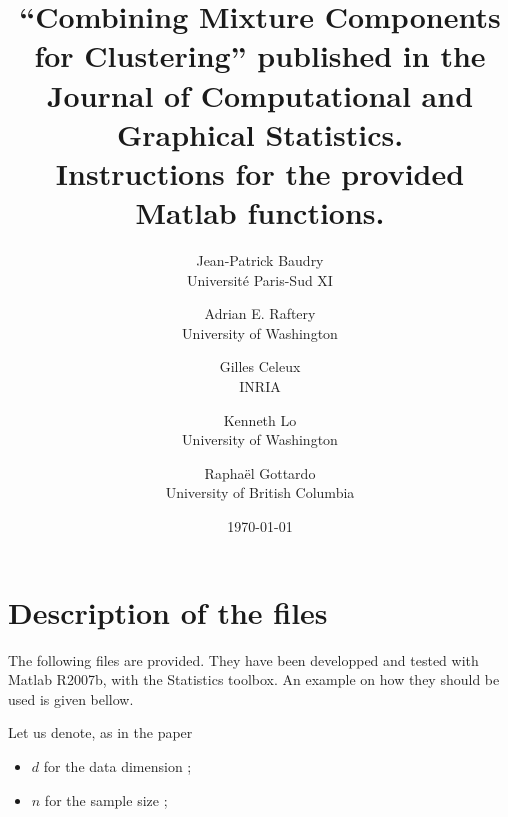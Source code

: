 \documentclass[12pt]{article}
\title{``Combining Mixture Components for Clustering'' published in the Journal of Computational and Graphical Statistics.\\ Instructions for the provided Matlab functions.}
\author{Jean-Patrick Baudry \\ Universit\'{e} Paris-Sud XI \and
Adrian E. Raftery \\ University of Washington \and 
Gilles Celeux \\ INRIA \and
Kenneth Lo \\ University of Washington \and
Rapha\"{e}l Gottardo \\ University of British Columbia}
\date{\today}
\begin{document}
\maketitle

\section{Description of the files}

The following files are provided. They have been developped and tested with Matlab R2007b, with the Statistics toolbox. An example on how they should be used is given bellow.

Let us denote, as in the paper
\begin{itemize}
\item $d$ for the data dimension ;
\item $n$ for the sample size ;
\end{itemize}
\end{document}
